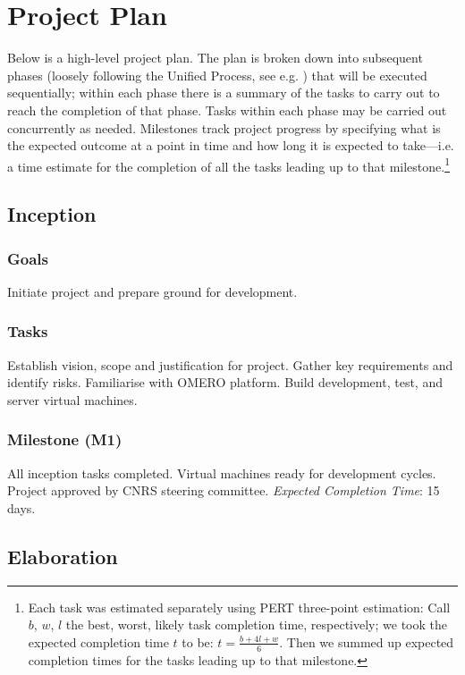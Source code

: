 \section{Project Plan}
Below is a high-level project plan. The plan is broken down into subsequent phases
(loosely following the Unified Process, see e.g. \cite{kruchten:rup}) that will be
executed sequentially; within each phase there is a summary of the tasks to carry 
out to reach the completion of that phase. Tasks within each phase may be carried 
out concurrently as needed. Milestones track project progress by specifying what is
the expected outcome at a point in time and how long it is expected to take---i.e. 
a time estimate for the completion of all the tasks leading up to that 
milestone.\footnote{Each task was estimated separately using PERT three-point 
estimation: Call $b$, $w$, $l$ the best, worst, likely task completion time, 
respectively; we took the expected completion time $t$ to be: $t = \frac{b + 4l + w}{6}$. 
Then we summed up expected completion times for the tasks leading up to that milestone.
}

\subsection{Inception}

\subsubsection*{Goals}
Initiate project and prepare ground for development. 

\subsubsection*{Tasks} 
Establish vision, scope and justification for project. 
Gather key requirements and identify risks.
Familiarise with OMERO platform.
Build development, test, and server virtual machines.

\subsubsection*{Milestone (M1)}
All inception tasks completed. Virtual machines ready for development cycles.
Project approved by CNRS steering committee.
\emph{Expected Completion Time}: 15 days.

\subsection{Elaboration}

